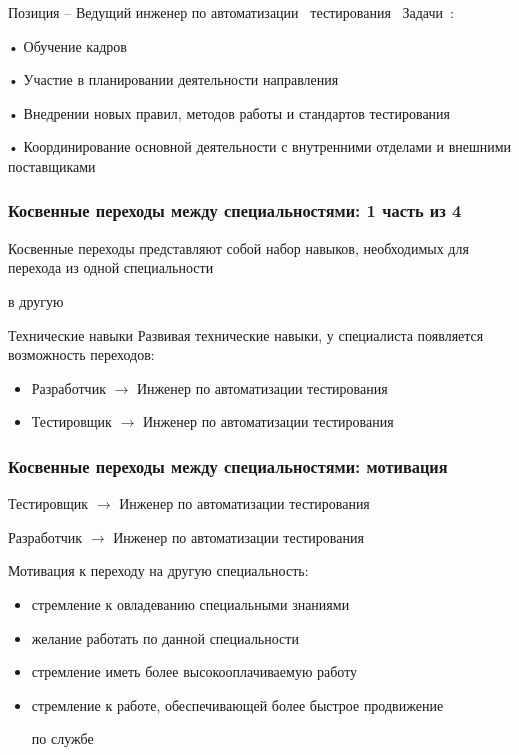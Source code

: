\documentclass{../industrial-development}
\begin{document}
\lecturenotes

Позиция – Ведущий  инженер по автоматизации~\cite{hh} тестирования~\cite{itcf}
Задачи~\cite{rab}:

•	Обучение кадров

•	Участие в планировании деятельности направления

•	Внедрении новых правил, методов работы и стандартов тестирования

•	Координирование основной деятельности с внутренними отделами и внешними поставщиками





\begin{frame} \frametitle{Косвенные переходы между специальностями: 1 часть из 4}


Косвенные переходы представляют собой набор навыков, необходимых для перехода из одной специальности 

в другую

 \bigskip
 \begin{block}{Технические навыки}
 Развивая \alert{технические навыки}, у специалиста появляется возможность переходов: 
\begin{itemize}
  \item Разработчик $\rightarrow$ Инженер по автоматизации тестирования
  \item Тестировщик $\rightarrow$ Инженер по автоматизации тестирования
  \end{itemize}
  \end{block}
\end{frame}


\begin{frame} \frametitle{Косвенные переходы между специальностями: мотивация }

 \begin{block}{Тестировщик $\rightarrow$  Инженер по автоматизации тестирования  

Разработчик $\rightarrow$  Инженер по автоматизации тестирования }
Мотивация к переходу на другую специальность:
  \end{block}
\begin{itemize}
\item стремление к овладеванию специальными знаниями
\item желание работать по данной специальности
\item стремление иметь более высокооплачиваемую работу 
\item стремление к работе, обеспечивающей более быстрое продвижение 

по службе
  \end{itemize}
\end{frame}
\end{document}
